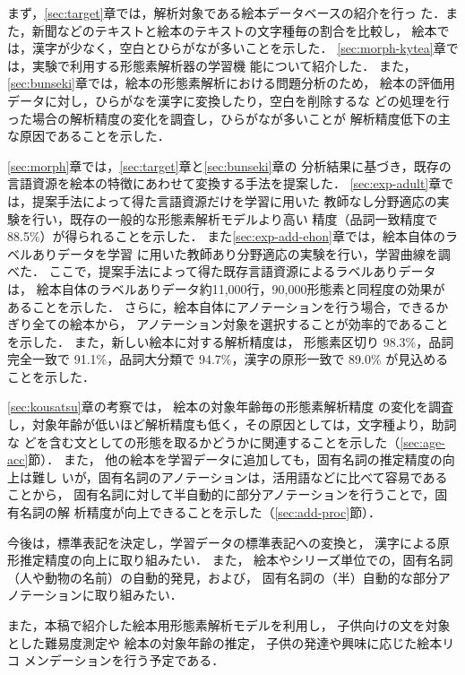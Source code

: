 \documentclass[japanese]{jnlp_1.4}
\newcommand{\kytea}{}
\begin{document}
まず，\ref{sec:target}章では，解析対象である絵本データベースの紹介を行っ
た．また，新聞などのテキストと絵本のテキストの文字種毎の割合を比較し，
絵本では，漢字が少なく，空白とひらがなが多いことを示した．
\ref{sec:morph-kytea}章では，実験で利用する形態素解析器\kytea の学習機
能について紹介した．
また，\ref{sec:bunseki}章では，絵本の形態素解析における問題分析のため，
絵本の評価用データに対し，ひらがなを漢字に変換したり，空白を削除するな
どの処理を行った場合の解析精度の変化を調査し，ひらがなが多いことが
解析精度低下の主な原因であることを示した．

\ref{sec:morph}章では，\ref{sec:target}章と\ref{sec:bunseki}章の
分析結果に基づき，既存の言語資源を絵本の特徴にあわせて変換する手法を提案した．
\ref{sec:exp-adult}章では，提案手法によって得た言語資源だけを学習に用いた
教師なし分野適応の実験を行い，既存の一般的な形態素解析モデルより高い
精度（品詞一致精度で 88.5\%）が得られることを示した．
また\ref{sec:exp-add-ehon}章では，絵本自体のラベルありデータを学習
に用いた教師あり分野適応の実験を行い，学習曲線を調べた．
ここで，提案手法によって得た既存言語資源によるラベルありデータは，
絵本自体のラベルありデータ約11,000行，90,000形態素と同程度の効果が
あることを示した．
さらに，絵本自体にアノテーションを行う場合，できるかぎり全ての絵本から，
アノテーション対象を選択することが効率的であることを示した．
また，新しい絵本に対する解析精度は，
形態素区切り 98.3\%，品詞完全一致で 91.1\%，品詞大分類で 94.7\%，漢字の原形一致で 89.0\% が見込めることを示した．

\ref{sec:kousatsu}章の考察では，
絵本の対象年齢毎の形態素解析精度
の変化を調査し，対象年齢が低いほど解析精度も低く，その原因としては，文字種より，助詞な
どを含む文としての形態を取るかどうかに関連することを示した（\ref{sec:age-acc}節）．
また，
他の絵本を学習データに追加しても，固有名詞の推定精度の向上は難し
いが，固有名詞のアノテーションは，活用語などに比べて容易であることから，
固有名詞に対して半自動的に部分アノテーションを行うことで，固有名詞の解
析精度が向上できることを示した（\ref{sec:add-proc}節）．


今後は，標準表記を決定し，学習データの標準表記への変換と，
漢字による原形推定精度の向上に取り組みたい．
また，
絵本やシリーズ単位での，固有名詞（人や動物の名前）の自動的発見，および，
固有名詞の（半）自動的な部分アノテーションに取り組みたい．

また，本稿で紹介した絵本用形態素解析モデルを利用し，
子供向けの文を対象とした難易度測定や
絵本の対象年齢の推定\cite{Fujita:Kobayashi:Taira:Minami:Tanaka:2014j}，
子供の発達や興味に応じた絵本リコ
メンデーションを行う予定である．
\end{document}
